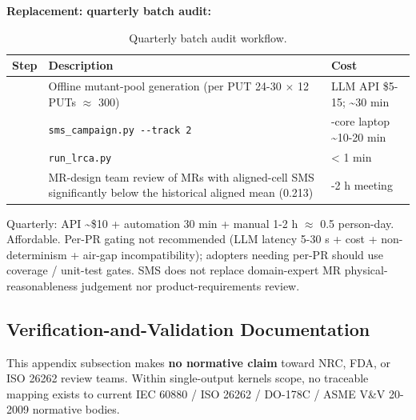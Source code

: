 \documentclass[manuscript,screen,review]{acmart}
\begin{document}
\textbf{Replacement: quarterly batch audit:}

{%
\begin{longtable}[]{@{}
  >{\raggedright\arraybackslash}p{}
  >{\raggedright\arraybackslash}p{}
  >{\raggedright\arraybackslash}p{}@{}}
\caption{Quarterly batch audit workflow.}\label{tab:p2-26}\\
\toprule\noalign{}
\begin{minipage}[b]{\linewidth}\raggedright
Step
\end{minipage} & \begin{minipage}[b]{\linewidth}\raggedright
Description
\end{minipage} & \begin{minipage}[b]{\linewidth}\raggedright
Cost
\end{minipage} \\
\midrule\noalign{}
\endfirsthead
\endhead
\bottomrule\noalign{}
\endlastfoot
1 & Offline mutant-pool generation (per PUT 24-30 $\times$ 12 PUTs $\approx$ 300) & LLM
API \$5-15; \textasciitilde30 min \\
2 & \texttt{sms\_campaign.py\ -\/-track\ 2} & 4-core laptop
\textasciitilde10-20 min \\
3 & \texttt{run\_lrca.py} & \textless{} 1 min \\
4 & MR-design team review of MRs with aligned-cell SMS significantly
below the historical aligned mean (0.213) & 1-2 h meeting \\
\end{longtable}
}

Quarterly: API \textasciitilde\$10 + automation 30 min + manual 1-2 h $\approx$
0.5 person-day. Affordable. Per-PR gating not recommended (LLM latency
5-30 s + cost + non-determinism + air-gap incompatibility); adopters
needing per-PR should use coverage / unit-test gates. SMS does not
replace domain-expert MR physical-reasonableness judgement nor
product-requirements review.

\subsection{Verification-and-Validation Documentation}\label{e.3-vv-documentation-conceptual-complementarity-with-asme-vv-20-2009}

This appendix subsection makes \textbf{no normative claim} toward NRC,
FDA, or ISO 26262 review teams. Within single-output kernels scope, no
traceable mapping exists to current IEC 60880 / ISO 26262 / DO-178C /
ASME V\&V 20-2009 normative bodies.
\end{document}
